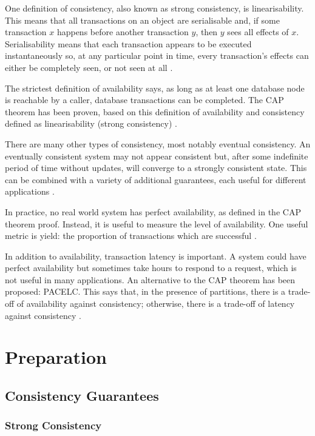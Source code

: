 \documentclass[12pt,a4paper,twoside,openany]{report}
\begin{document}
One definition of consistency, also known as strong consistency, is linearisability. This means that all transactions on an object are serialisable and, if some transaction $x$ happens before another transaction $y$, then $y$ sees all effects of $x$. Serialisability means that each transaction appears to be executed instantaneously so, at any particular point in time, every transaction's effects can either be completely seen, or not seen at all \cite{herlihy1990linearizability}.

The strictest definition of availability says, as long as at least one database node is reachable by a caller, database transactions can be completed. The CAP theorem has been proven, based on this definition of availability and consistency defined as linearisability (strong consistency) \cite{gilbert}.

There are many other types of consistency, most notably eventual consistency. An eventually consistent system may not appear consistent but, after some indefinite period of time without updates, will converge to a strongly consistent state. This can be combined with a variety of additional guarantees, each useful for different applications \cite{vogels_2008}.

In practice, no real world system has perfect availability, as defined in the CAP theorem proof. Instead, it is useful to measure the level of availability. One useful metric is yield: the proportion of transactions which are successful \cite{fox1999harvest}.

In addition to availability, transaction latency is important. A system could have perfect availability but sometimes take hours to respond to a request, which is not useful in many applications. An alternative to the CAP theorem has been proposed: PACELC. This says that, in the presence of partitions, there is a trade-off of availability against consistency; otherwise, there is a trade-off of latency against consistency \cite{abadi2012consistency}.

\chapter{Preparation}

\section{Consistency Guarantees}

\subsection*{Strong Consistency}
\end{document}
